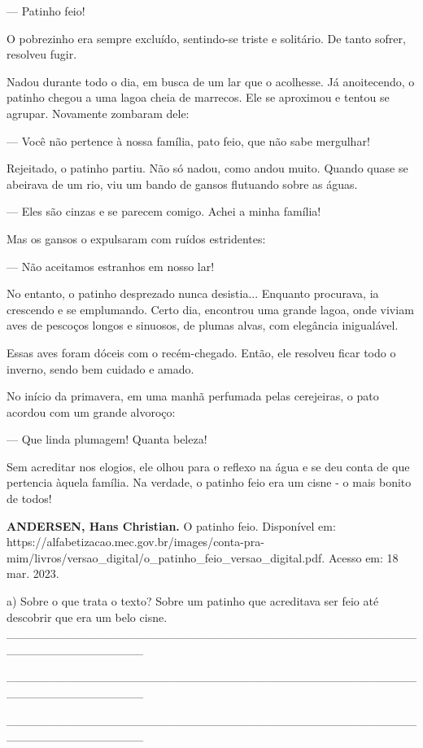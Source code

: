 \begin{escolha}
\begin{escolha}
{--- Patinho feio!

O pobrezinho era sempre excluído, sentindo-se triste e solitário. De
tanto sofrer, resolveu fugir.

Nadou durante todo o dia, em busca de um lar que o acolhesse. Já
anoitecendo, o patinho chegou a uma lagoa cheia de marrecos. Ele se
aproximou e tentou se agrupar. Novamente zombaram dele:

--- Você não pertence à nossa família, pato feio, que não sabe
mergulhar!

Rejeitado, o patinho partiu. Não só nadou, como andou muito. Quando
quase se abeirava de um rio, viu um bando de gansos flutuando sobre as
águas.

--- Eles são cinzas e se parecem comigo. Achei a minha família!

Mas os gansos o expulsaram com ruídos estridentes:

--- Não aceitamos estranhos em nosso lar!

No entanto, o patinho desprezado nunca desistia... Enquanto procurava,
ia crescendo e se emplumando. Certo dia, encontrou uma grande lagoa,
onde viviam aves de pescoços longos e sinuosos, de plumas alvas, com
elegância inigualável.

Essas aves foram dóceis com o recém-chegado. Então, ele resolveu ficar
todo o inverno, sendo bem cuidado e amado.

No início da primavera, em uma manhã perfumada pelas cerejeiras, o pato
acordou com um grande alvoroço:

--- Que linda plumagem! Quanta beleza!

Sem acreditar nos elogios, ele olhou para o reflexo na água e se deu
conta de que pertencia àquela família. Na verdade, o patinho feio era um
cisne - o mais bonito de todos!

\textbf{ANDERSEN, Hans Christian.} O patinho feio. Disponível em:
https://alfabetizacao.mec.gov.br/images/conta-pra-mim/livros/versao\_digital/o\_patinho\_feio\_versao\_digital.pdf.
Acesso em: 18 mar. 2023.

a) Sobre o que trata o texto? Sobre um patinho que acreditava ser feio
até descobrir que era um belo cisne.
\_\_\_\_\_\_\_\_\_\_\_\_\_\_\_\_\_\_\_\_\_\_\_\_\_\_\_\_\_\_\_\_\_\_\_\_\_\_\_\_\_\_\_\_\_\_\_\_\_\_\_\_\_\_\_\_\_\_\_\_\_\_\_\_

\_\_\_\_\_\_\_\_\_\_\_\_\_\_\_\_\_\_\_\_\_\_\_\_\_\_\_\_\_\_\_\_\_\_\_\_\_\_\_\_\_\_\_\_\_\_\_\_\_\_\_\_\_\_\_\_\_\_\_\_\_\_\_\_

\_\_\_\_\_\_\_\_\_\_\_\_\_\_\_\_\_\_\_\_\_\_\_\_\_\_\_\_\_\_\_\_\_\_\_\_\_\_\_\_\_\_\_\_\_\_\_\_\_\_\_\_\_\_\_\_\_\_\_\_\_\_\_\_

}
\end{escolha}
\end{escolha}
